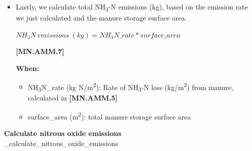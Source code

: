 \begin{refsection}
\begin{itemize}
\textbf{When:}
    \begin{itemize}
        \item TAN (kg): Mass of ammoniacal N in stored manure
        \item c: time conversion constant (86400 s per d)
        \item y: manure density, set to 990 kg/m\textsuperscript{3} 
        \item STORAGE\_RESISTANCE: A constant value representing the sum of resistance of NH\textsubscript{3} transfer from solution to manure surface, and from manure surface to atmosphere, set at 23.1 s/m.
        \item M (kg): Total mass of stored manure
        \item Q: Equilirbium coefficient calculated in \textbf{[MN.AMM.3]}

    \end{itemize}

        \item Lastly, we calculate total NH\textsubscript{3}-N emissions (kg), based on the emission rate we just calculated and the manure storage surface area.
         \vspace{0.2cm}

    \begin{center}
\(NH_3N\ emissions\ (kg) = NH_3N\_rate * surface\_area\)
    \end{center}
        \vspace{0.5cm} 
    
            {\raggedleft \textbf{[MN.AMM.7]}\par}
            \vspace{0.5cm}

\textbf{When:}
    \begin{itemize}
        \item NH\textsubscript{3}N\_rate (kg N/m\textsuperscript{2}): Rate of NH\textsubscript{3}-N loss (kg/m\textsuperscript{2}) from manure, calculated in \textbf{[MN.AMM.5]}
        \item surface\_area (m\textsuperscript{2}): total manure storage surface area

    \end{itemize}
        
    \end{itemize} 
    \vspace{0.5cm}

\textbf{Calculate nitrous oxide emissions}\\
\_calculate\_nitrous\_oxide\_emissions
\vspace{0.2cm}


\end{refsection}
